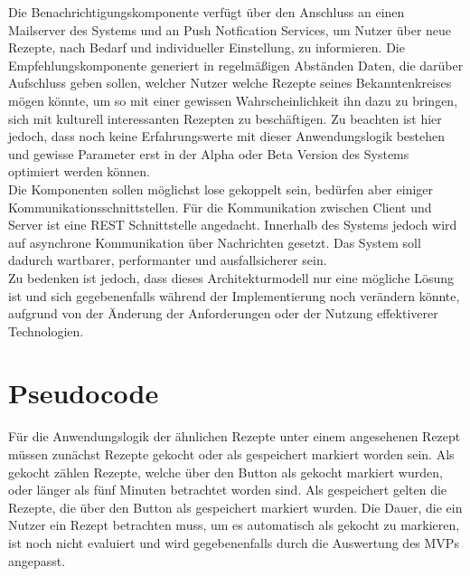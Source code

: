Die Benachrichtigungskomponente verfügt über den Anschluss an einen Mailserver des Systems und an Push Notfication Services, um Nutzer über neue Rezepte, nach Bedarf und individueller Einstellung, zu informieren. Die Empfehlungskomponente generiert in regelmäßigen Abständen Daten, die darüber Aufschluss geben sollen, welcher Nutzer welche Rezepte seines Bekanntenkreises mögen könnte, um so mit einer gewissen Wahrscheinlichkeit ihn dazu zu bringen, sich mit kulturell interessanten Rezepten zu beschäftigen. Zu beachten ist hier jedoch, dass noch keine Erfahrungswerte mit dieser Anwendungslogik bestehen und gewisse Parameter erst in der Alpha oder Beta Version des Systems optimiert werden können.\\

Die Komponenten sollen möglichst lose gekoppelt sein, bedürfen aber einiger Kommunikationsschnittstellen. Für die Kommunikation zwischen Client und Server ist eine REST Schnittstelle angedacht. Innerhalb des Systems jedoch wird auf asynchrone Kommunikation über Nachrichten gesetzt. Das System soll dadurch wartbarer, performanter und ausfallsicherer sein. \\

Zu bedenken ist jedoch, dass dieses Architekturmodell nur eine mögliche Lösung ist und sich gegebenenfalls während der Implementierung noch verändern könnte, aufgrund von der Änderung der Anforderungen oder der Nutzung effektiverer Technologien.
\section{Pseudocode}
\label{subsec:SimilarRecipies}
Für die Anwendungslogik der ähnlichen Rezepte unter einem angesehenen Rezept müssen zunächst Rezepte gekocht oder als gespeichert markiert worden sein. Als gekocht zählen Rezepte, welche über den Button als gekocht markiert wurden, oder länger als fünf Minuten betrachtet worden sind. Als gespeichert gelten die Rezepte, die über den Button als gespeichert markiert wurden. Die Dauer, die ein Nutzer ein Rezept betrachten muss, um es automatisch als gekocht zu markieren, ist noch nicht evaluiert und wird gegebenenfalls durch die Auswertung des MVPs angepasst. \\

